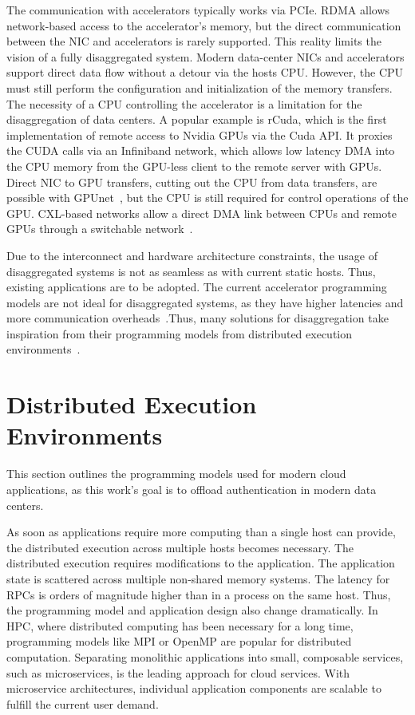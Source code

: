 The communication with accelerators typically works via \ac{PCIe}. \ac{RDMA} allows network-based access to the accelerator's memory, but the direct communication between the \ac{NIC} and accelerators is rarely supported. This reality limits the vision of a fully disaggregated system. Modern data-center \acp{NIC} and accelerators support direct data flow without a detour via the hosts \ac{CPU}. However, the \ac{CPU} must still perform the configuration and initialization of the memory transfers. The necessity of a \ac{CPU} controlling the accelerator is a limitation for the disaggregation of data centers. A popular example is rCuda\cite{duatoRCUDAReducingNumber2010}, which is the first implementation of remote access to Nvidia \acp{GPU} via the Cuda \ac{API}. It proxies the CUDA calls via an Infiniband network, which allows low latency \ac{DMA} into the \ac{CPU} memory from the GPU-less client to the remote server with GPUs. Direct \ac{NIC} to \ac{GPU} transfers, cutting out the \ac{CPU} from data transfers, are possible with GPUnet~\cite{silbersteinGPUnetNetworkingAbstractions2016}, but the \ac{CPU} is still required for control operations of the \ac{GPU}. \ac{CXL}-based networks allow a direct \ac{DMA} link between \acp{CPU} and remote \acp{GPU} through a switchable network~\cite{arifAcceleratingPerformanceGPUbased2023}.

Due to the interconnect and hardware architecture constraints, the usage of disaggregated systems is not as seamless as with current static hosts. Thus, existing applications are to be adopted. The current accelerator programming models are not ideal for disaggregated systems, as they have higher latencies and more communication overheads~\cite{hanNetworkSupportResource2013}.\@ Thus, many solutions for disaggregation take inspiration from their programming models from distributed execution environments~\cite{moritzRayDistributedFramework}\@.

\section{Distributed Execution Environments}
This section outlines the programming models used for modern cloud applications, as this work's goal is to offload authentication in modern data centers.

As soon as applications require more computing than a single host can provide, the distributed execution across multiple hosts becomes necessary. The distributed execution requires modifications to the application. The application state is scattered across multiple non-shared memory systems. The latency for \acp{RPC} is orders of magnitude higher than in a process on the same host. Thus, the programming model and application design also change dramatically. In \ac{HPC}, where distributed computing has been necessary for a long time, programming models like MPI or OpenMP are popular for distributed computation. Separating monolithic applications into small, composable services, such as microservices, is the leading approach for cloud services. With microservice architectures, individual application components are scalable to fulfill the current user demand.

